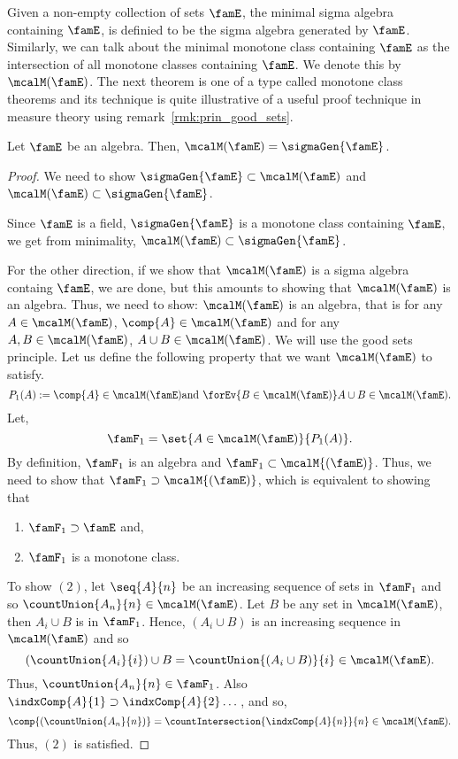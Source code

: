Given a non-empty collection of sets $\famE$, the minimal sigma algebra containing $\famE$, is definied to be
the sigma algebra generated by $\famE$. Similarly, we can talk about the minimal monotone class containing
$\famE$ as the intersection of all monotone classes containing $\famE$. We denote this by $\mcalM(\famE)$. The
next theorem is one of a type called monotone class theorems and its technique is quite illustrative of a
useful proof technique in measure theory using remark~\ref{rmk:prin_good_sets}.
\begin{Theorem}
    Let $\famE$ be an algebra. Then, $\mcalM(\famE) = \sigmaGen{\famE}$.
\end{Theorem}
\begin{proof}
    We need to show $\sigmaGen{\famE} \subset \mcalM(\famE)$ and $\mcalM(\famE) \subset \sigmaGen{\famE}$.

    Since $\famE$ is a field, $\sigmaGen{\famE}$ is a monotone class containing $\famE$, we get from minimality,
    $\mcalM(\famE) \subset \sigmaGen{\famE}$.

    For the other direction, if we show that $\mcalM(\famE)$ is a sigma algebra containg $\famE$, we are done,
    but this amounts to showing that $\mcalM(\famE)$ is an algebra.
    Thus, we need to show: $\mcalM(\famE)$ is an algebra, that is for any $A \in \mcalM(\famE)$, $\comp{A}\in
    \mcalM(\famE)$ and for any $A,B \in \mcalM(\famE)$, $A\cup B \in \mcalM(\famE)$. We will use the good sets
    principle.
    Let us define the following property that we want $\mcalM(\famE)$ to satisfy.
    \[P_1(A) := \comp{A}\in \mcalM(\famE) \text{and} \hspace{0.05in} \forEv{B\in\mcalM(\famE)}A\cup B \in
	\mcalM(\famE).\]
    Let,
    \[\famF_{1} = \set{A\in\mcalM(\famE)}{P_1(A)}.\]
    By definition, $\famF_{1}$ is an algebra and $\famF_{1}\subset\mcalM{(\famE)}$. Thus, we need to show that
    $\famF_{1} \supset \mcalM{(\famE)}$, which is equivalent to showing that 
    \begin{enumerate}
	\item
	    $\famF_{1} \supset \famE$ and,
	\item
	    $\famF_{1}$ is a monotone class.
    \end{enumerate}
    To show $(2)$, let $\seq{A}{n}$ be an increasing sequence of sets in $\famF_{1}$ and so
    $\countUnion{A_n}{n} \in \mcalM(\famE)$. Let $B$ be any set in $\mcalM(\famE)$, then $A_i \cup B$ is in
    $\famF_{1}$. Hence, $(A_i\cup B)$ is an increasing sequence in $\mcalM(\famE)$ and so 
    \[ \left(\countUnion{A_i}{i}\right) \cup B = \countUnion{(A_i\cup B)}{i} \in \mcalM(\famE).\]
    Thus, $\countUnion{A_n}{n}\in \famF_{1}$. Also $\indxComp{A}{1} \supset \indxComp{A}{2} \dots$, and so,
    \[\comp{(\countUnion{A_n}{n})} = \countIntersection{\indxComp{A}{n}}{n} \in \mcalM(\famE).\]
    Thus, $(2)$ is satisfied.


\end{proof}
